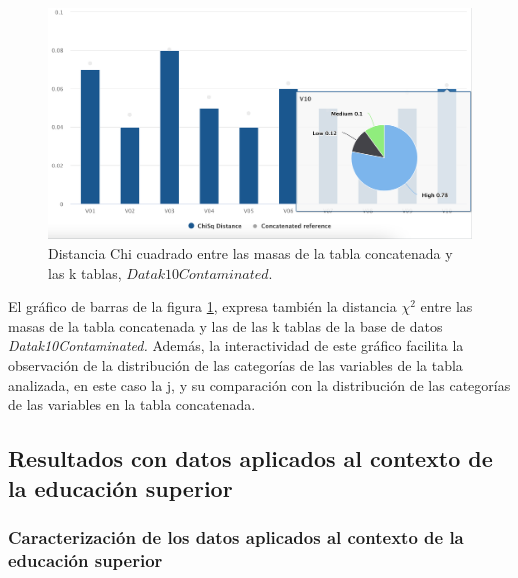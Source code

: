 \documentclass[mathematics,article,submit,moreauthors,pdftex]{mdpi}
\begin{document}
\begin{figure}[H]


\begin{center}\includegraphics[width=0.9\linewidth,]{Chisqr} \end{center}

\caption{Distancia Chi cuadrado entre las masas de la tabla concatenada y las k tablas, $Datak10Contaminated$.}

\label{fig:chisqr}
\end{figure}

El gráfico de barras de la figura \ref{fig:chisqr}, expresa también la
distancia \(\chi^{2}\) entre las masas de la tabla concatenada y las de
las k tablas de la base de datos \emph{Datak10Contaminated.} Además, la
interactividad de este gráfico facilita la observación de la
distribución de las categorías de las variables de la tabla analizada,
en este caso la j, y su comparación con la distribución de las
categorías de las variables en la tabla concatenada.

\hypertarget{resultados-con-datos-aplicados-al-contexto-de-la-educaciuxf3n-superior}{%
\subsection{Resultados con datos aplicados al contexto de la educación
superior}\label{resultados-con-datos-aplicados-al-contexto-de-la-educaciuxf3n-superior}}

\hypertarget{caracterizaciuxf3n-de-los-datos-aplicados-al-contexto-de-la-educaciuxf3n-superior}{%
\subsubsection{Caracterización de los datos aplicados al contexto de la
educación
superior}\label{caracterizaciuxf3n-de-los-datos-aplicados-al-contexto-de-la-educaciuxf3n-superior}}
\end{document}
